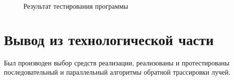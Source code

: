 \newpage
\begin{figure}[h!]
	
	
	\caption{Результат тестирования программы}
	
	\label{fig:work_example}
	
\end{figure}


\section{Вывод из технологической части}

Был производен выбор средств реализации, реализованы и протестированы последовательный и параллельный алгоритмы обратной трассировки лучей.
